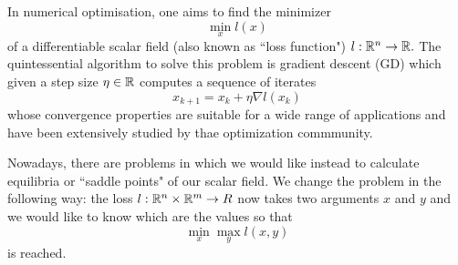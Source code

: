 \documentclass[main.tex]{subfiles}
\begin{document}
In numerical optimisation, one aims to find the minimizer \[\min_x l(x)\] of a
differentiable scalar field (also known as ``loss function") $l: \mathbb{R}^n \to \mathbb{R}.$
The quintessential algorithm to solve this problem is gradient descent (GD)
which given a step size $\eta \in \mathbb{R}$ computes a sequence of iterates \[x_{k+1} = x_k + \eta \nabla l(x_k)\] whose
convergence properties are suitable for a wide range of applications and have been
extensively studied by thae optimization commmunity.

Nowadays, there are problems in which we would like instead to calculate
equilibria or ``saddle points" of our scalar field. We change the problem in
the following way: the loss $l: \mathbb{R}^n \times \mathbb{R}^m \to R$ now takes two arguments
$x$ and $y$ and we would like to know which are the values so that \[\min_x
    \max_y l(x,y)\] is reached.
\end{document}
